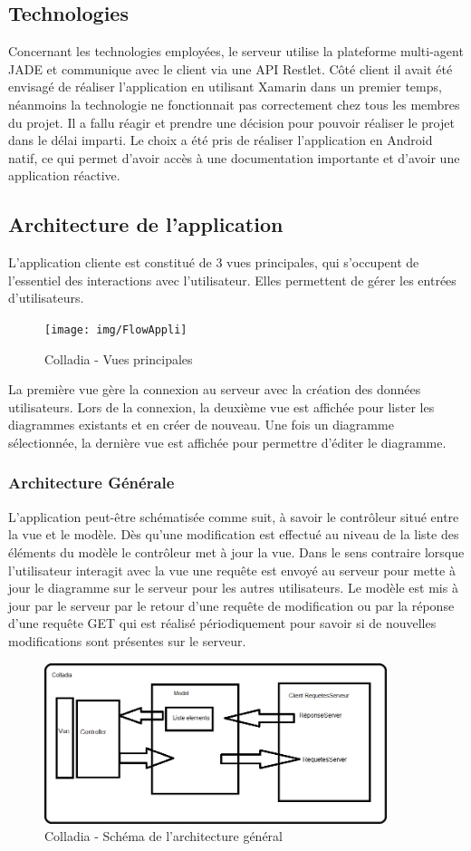 \subsection{Technologies}
Concernant les technologies employées, le serveur utilise la plateforme multi-agent JADE et communique avec le client via une API Restlet.
Côté client il avait été envisagé de réaliser l'application en utilisant Xamarin dans un premier temps, néanmoins la technologie ne fonctionnait pas correctement chez tous les membres du projet. Il a fallu réagir et prendre une décision pour pouvoir réaliser le projet dans le délai imparti. Le choix a été pris de réaliser l'application en Android natif, ce qui permet d'avoir accès à une documentation importante et d'avoir une application réactive.

\subsection{Architecture de l'application}
L'application cliente est constitué de 3 vues principales, qui s'occupent de l'essentiel des interactions avec l'utilisateur.
Elles permettent de gérer les entrées d'utilisateurs.
	\begin{figure}[!h]
		\centering
		\texttt{[image: img/FlowAppli]}
		\caption{Colladia - Vues principales}
	\end{figure}
La première vue gère la connexion au serveur avec la création des données utilisateurs. Lors de la connexion, la deuxième vue est affichée pour lister les diagrammes existants et en créer de nouveau.
Une fois un diagramme sélectionnée, la dernière vue est affichée pour permettre d'éditer le diagramme. 

\subsubsection{Architecture Générale}
L'application peut-être schématisée comme suit, à savoir le contrôleur situé entre la vue et le modèle. Dès qu'une modification est effectué au niveau de la liste des éléments du modèle le contrôleur met à jour la vue.
Dans le sens contraire lorsque l'utilisateur interagit avec la vue une requête est envoyé au serveur pour mette à jour le diagramme sur le serveur pour les autres utilisateurs.
Le modèle est mis à jour par le serveur par le retour d'une requête de modification ou par la réponse d'une requête GET qui est réalisé périodiquement pour savoir si de nouvelles modifications sont présentes sur le serveur. 
	\begin{figure}[!h]
		\centering
		\includegraphics[width=10cm]{img/archiGeneral}
		\caption{Colladia - Schéma de l'architecture général}
	\end{figure}
